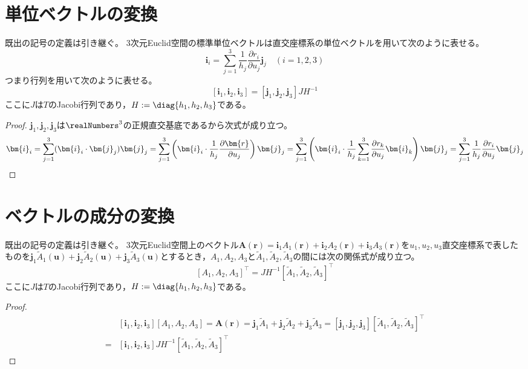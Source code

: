     \section{単位ベクトルの変換}
        \label{単位ベクトルの変換}
        \begin{shadebox}
            既出の記号の定義は引き継ぐ。
            3次元Euclid空間の標準単位ベクトルは直交座標系の単位ベクトルを用いて次のように表せる。
            \[ \bm{i}_i = \sum_{j=1}^3 \frac{1}{h_j}\frac{\partial r_i}{\partial u_j}\bm{j}_j \quad (i=1,2,3) \]
            つまり行列を用いて次のように表せる。
            \[ [\bm{i}_1, \bm{i}_2, \bm{i}_3] = [\bm{j}_1, \bm{j}_2, \bm{j}_3]JH^{-1} \]
            ここに$J$は$T$のJacobi行列であり，$H := \diag{h_1,h_2,h_3}$である。
        \end{shadebox}
        \begin{proof}
            \quad\par
            $\bm{j}_1,\bm{j}_2,\bm{j}_3$は$\realNumbers^3$の正規直交基底であるから次式が成り立つ。
            \[ \bm{i}_i = \sum_{j=1}^3 (\bm{i}_i\cdot\bm{j}_j)\bm{j}_j = \sum_{j=1}^3 \left(\bm{i}_i\cdot\frac{1}{h_j}\frac{\partial \bm{r}}{\partial u_j}\right)\bm{j}_j = \sum_{j=1}^3 \left(\bm{i}_i\cdot\frac{1}{h_j}\sum_{k=1}^3\frac{\partial r_k}{\partial u_j}\bm{i}_k\right)\bm{j}_j \\
            = \sum_{j=1}^3 \frac{1}{h_j}\frac{\partial r_i}{\partial u_j}\bm{j}_j \]
        \end{proof}
    \section{ベクトルの成分の変換}
        \label{ベクトルの成分の変換}
        \begin{shadebox}
            既出の記号の定義は引き継ぐ。
            3次元Euclid空間上のベクトル$\bm{A}(\bm{r}) = \bm{i}_1 A_1(\bm{r}) + \bm{i}_2 A_2(\bm{r}) + \bm{i}_3 A_3(\bm{r})$を$u_1,u_2,u_3$直交座標系で表したものを$\bm{j}_1 \tilde{A}_1(\bm{u}) + \bm{j}_2 \tilde{A}_2(\bm{u}) + \bm{j}_3 \tilde{A}_3(\bm{u})$とするとき，$A_1,A_2,A_3$と$\tilde{A}_1,\tilde{A}_2,\tilde{A}_3$の間には次の関係式が成り立つ。
            \[ [A_1,A_2,A_3]^\top = JH^{-1}[\tilde{A}_1,\tilde{A}_2,\tilde{A}_3]^\top \]
            ここに$J$は$T$のJacobi行列であり，$H := \diag{h_1,h_2,h_3}$である。
        \end{shadebox}
        \begin{proof}
            \begin{align*}
                \phantom{=} &[\bm{i}_1,\bm{i}_2,\bm{i}_3][A_1,A_2,A_3] = \bm{A}(\bm{r}) = \bm{j}_1 \tilde{A}_1 + \bm{j}_2 \tilde{A}_2 + \bm{j}_3 \tilde{A}_3 = [\bm{j}_1,\bm{j}_2,\bm{j}_3][\tilde{A}_1,\tilde{A}_2,\tilde{A}_3]^\top \\
                = &[\bm{i}_1,\bm{i}_2,\bm{i}_3]JH^{-1}[\tilde{A}_1,\tilde{A}_2,\tilde{A}_3]^\top
            \end{align*}
        \end{proof}
